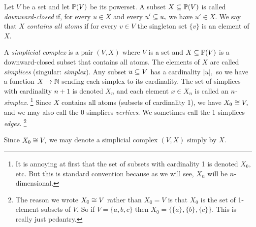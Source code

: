 \documentclass[CT4S-EN-RU]{subfiles}
\begin{document}
\begin{definitionENG}\label{def:simplicial complex}
Let $V$ be a set and let $\PP(V)$ be its powerset. A subset $X\ss\PP(V)$ is called {\em downward-closed} if, for every $u\in X$ and every $u'\ss u,$ we have $u'\in X.$ We say that $X$ {\em contains all atoms} if for every $v\in V$ the singleton set $\{v\}$ is an element of $X.$ 

A {\em simplicial complex} is a pair $(V,X)$ where $V$ is a set and $X\ss\PP(V)$ is a downward-closed subset that contains all atoms. The elements of $X$ are called {\em simplices} (singular: {\em simplex}). Any subset $u\ss V$ has a cardinality $|u|,$ so we have a function $X\to\NN$ sending each simplex to its cardinality. The set of simplices with cardinality $n+1$ is denoted $X_n$ and each element $x\in X_n$ is called an {\em $n$-simplex}.%
\footnote{It is annoying at first that the set of subsets with cardinality 1 is denoted $X_0,$ etc. But this is standard convention because as we will see, $X_n$ will be $n$-dimensional.}
Since $X$ contains all atoms (subsets of cardinality 1), we have $X_0\iso V,$ and we may also call the 0-simplices {\em vertices}. We sometimes call the 1-simplices {\em edges}.%
\footnote{The reason we wrote $X_0\iso V$ rather than $X_0=V$ is that $X_0$ is the set of 1-element subsets of $V.$ So if $V=\{a,b,c\}$ then $X_0=\{\{a\},\{b\},\{c\}\}.$ This is really just pedantry.}

Since $X_0\iso V,$ we may denote a simplicial complex $(V,X)$ simply by $X.$
\end{definitionENG}
\end{document}
